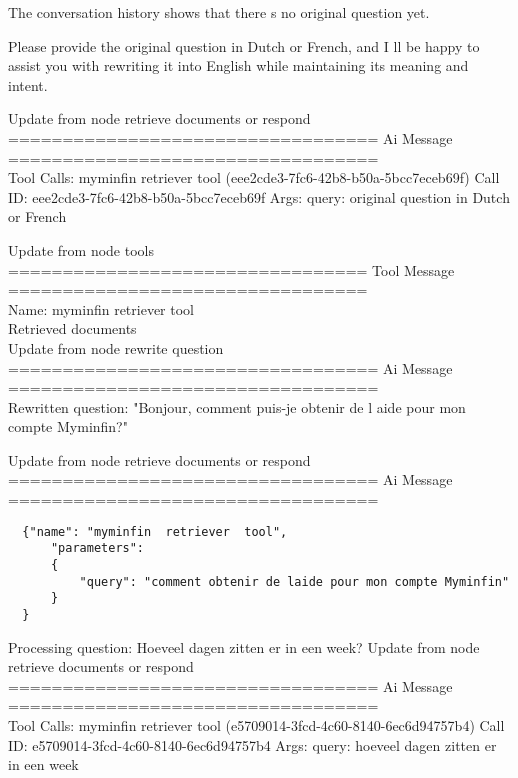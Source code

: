 The conversation history shows that there s no original question yet.

Please provide the original question in Dutch or French, and I ll be happy to assist you with rewriting it into English while maintaining its meaning and intent.



Update from node retrieve  documents  or  respond
\\[1em]
================================== Ai Message ==================================
\\[1em]
Tool Calls:
myminfin  retriever  tool (eee2cde3-7fc6-42b8-b50a-5bcc7eceb69f)
Call ID: eee2cde3-7fc6-42b8-b50a-5bcc7eceb69f
Args:
query: original question in Dutch or French



Update from node tools
\\[1em]
================================= Tool Message =================================
\\[1em]
Name: myminfin  retriever  tool
\\[1em]
Retrieved documents
\\[1em]


Update from node rewrite  question
\\[1em]
================================== Ai Message ==================================
\\[1em]

Rewritten question:
"Bonjour, comment puis-je obtenir de l aide pour mon compte Myminfin?"



Update from node retrieve  documents  or  respond
\\[1em]
================================== Ai Message ==================================
\\[1em]

\begin{verbatim}
  {"name": "myminfin  retriever  tool", 
      "parameters": 
      {
          "query": "comment obtenir de laide pour mon compte Myminfin"
      }
  }
\end{verbatim}

Processing question: Hoeveel dagen zitten er in een week?
Update from node retrieve  documents  or  respond
\\[1em]
================================== Ai Message ==================================
\\[1em]
Tool Calls:
myminfin  retriever  tool (e5709014-3fcd-4c60-8140-6ec6d94757b4)
Call ID: e5709014-3fcd-4c60-8140-6ec6d94757b4
Args:
query: hoeveel dagen zitten er in een week



